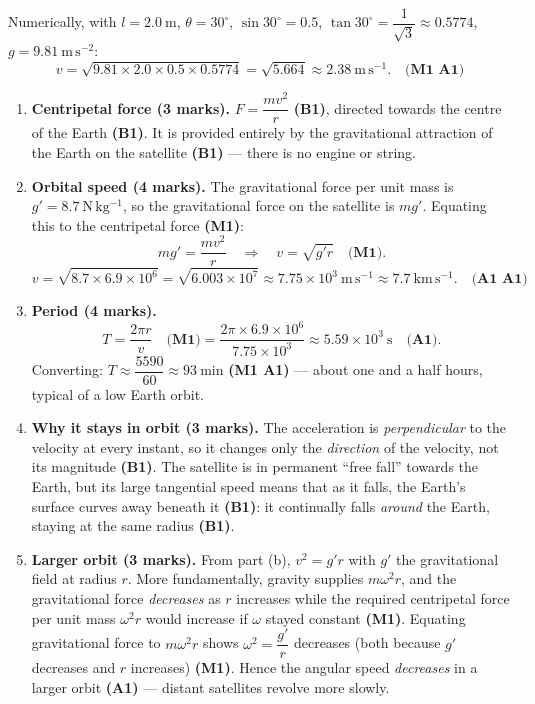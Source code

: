 \documentclass[11pt]{article}
\newcommand{\cle}[1]{{\popxbold\color{popdark}#1}}
\begin{document}
\begin{corrige}
\begin{enumerate}
Numerically, with $l = 2.0\ \mathrm{m}$, $\theta = 30^{\circ}$, $\sin 30^{\circ} = 0.5$, $\tan 30^{\circ} = \dfrac{1}{\sqrt{3}} \approx 0.5774$, $g = 9.81\ \mathrm{m\,s^{-2}}$:
\[ v = \sqrt{9.81\times 2.0\times 0.5\times 0.5774} = \sqrt{5.664} \approx 2.38\ \mathrm{m\,s^{-1}}. \quad \textbf{(M1 A1)} \]
\end{enumerate}
\end{corrige}

\begin{corrige}
\begin{enumerate}
\item \textbf{Centripetal force (3 marks).} $F = \dfrac{mv^{2}}{r}$ \textbf{(B1)}, directed towards the centre of the Earth \textbf{(B1)}. It is provided entirely by the \cle{gravitational attraction} of the Earth on the satellite \textbf{(B1)} — there is no engine or string.
\item \textbf{Orbital speed (4 marks).} The gravitational force per unit mass is $g' = 8.7\ \mathrm{N\,kg^{-1}}$, so the gravitational force on the satellite is $mg'$. Equating this to the centripetal force \textbf{(M1)}:
\[ mg' = \frac{mv^{2}}{r} \quad\Longrightarrow\quad v = \sqrt{g'r} \quad \textbf{(M1)}. \]
\[ v = \sqrt{8.7\times 6.9\times 10^{6}} = \sqrt{6.003\times 10^{7}} \approx 7.75\times 10^{3}\ \mathrm{m\,s^{-1}} \approx 7.7\ \mathrm{km\,s^{-1}}. \quad \textbf{(A1 A1)} \]
\item \textbf{Period (4 marks).} 
\[ T = \frac{2\pi r}{v} \quad \textbf{(M1)} = \frac{2\pi\times 6.9\times 10^{6}}{7.75\times 10^{3}} \approx 5.59\times 10^{3}\ \mathrm{s} \quad \textbf{(A1)}. \]
Converting: $T \approx \dfrac{5590}{60} \approx 93\ \mathrm{min}$ \textbf{(M1 A1)} — about one and a half hours, typical of a low Earth orbit.
\item \textbf{Why it stays in orbit (3 marks).} The acceleration is \emph{perpendicular} to the velocity at every instant, so it changes only the \emph{direction} of the velocity, not its magnitude \textbf{(B1)}. The satellite is in permanent ``free fall'' towards the Earth, but its large tangential speed means that as it falls, the Earth's surface curves away beneath it \textbf{(B1)}: it continually falls \emph{around} the Earth, staying at the same radius \textbf{(B1)}.
\item \textbf{Larger orbit (3 marks).} From part (b), $v^{2} = g'r$ with $g'$ the gravitational field at radius $r$. More fundamentally, gravity supplies $m\omega^{2}r$, and the gravitational force \emph{decreases} as $r$ increases while the required centripetal force per unit mass $\omega^{2}r$ would increase if $\omega$ stayed constant \textbf{(M1)}. Equating gravitational force to $m\omega^{2}r$ shows $\omega^{2} = \dfrac{g'}{r}$ decreases (both because $g'$ decreases and $r$ increases) \textbf{(M1)}. Hence the angular speed \emph{decreases} in a larger orbit \textbf{(A1)} — distant satellites revolve more slowly.
\end{enumerate}
\end{corrige}
\end{document}
